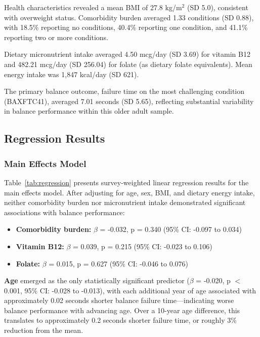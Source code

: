 \documentclass[11pt,a4paper]{article}
\begin{document}
Health characteristics revealed a mean BMI of 27.8 kg/m$^2$ (SD 5.0), consistent with overweight status. Comorbidity burden averaged 1.33 conditions (SD 0.88), with 18.5\% reporting no conditions, 40.4\% reporting one condition, and 41.1\% reporting two or more conditions.

Dietary micronutrient intake averaged 4.50 mcg/day (SD 3.69) for vitamin B12 and 482.21 mcg/day (SD 256.04) for folate (as dietary folate equivalents). Mean energy intake was 1,847 kcal/day (SD 621).

The primary balance outcome, failure time on the most challenging condition (BAXFTC41), averaged 7.01 seconds (SD 5.65), reflecting substantial variability in balance performance within this older adult sample.

\subsection{Regression Results}

\subsubsection{Main Effects Model}

Table~\ref{tab:regression} presents survey-weighted linear regression results for the main effects model. After adjusting for age, sex, BMI, and dietary energy intake, neither comorbidity burden nor micronutrient intake demonstrated significant associations with balance performance:

\begin{itemize}
    \item \textbf{Comorbidity burden:} $\beta$ = -0.032, p = 0.340 (95\% CI: -0.097 to 0.034)
    \item \textbf{Vitamin B12:} $\beta$ = 0.039, p = 0.215 (95\% CI: -0.023 to 0.106)
    \item \textbf{Folate:} $\beta$ = 0.015, p = 0.627 (95\% CI: -0.046 to 0.076)
\end{itemize}

\textbf{Age} emerged as the only statistically significant predictor ($\beta$ = -0.020, p $<$ 0.001, 95\% CI: -0.028 to -0.013), with each additional year of age associated with approximately 0.02 seconds shorter balance failure time—indicating worse balance performance with advancing age. Over a 10-year age difference, this translates to approximately 0.2 seconds shorter failure time, or roughly 3\% reduction from the mean.
\end{document}
